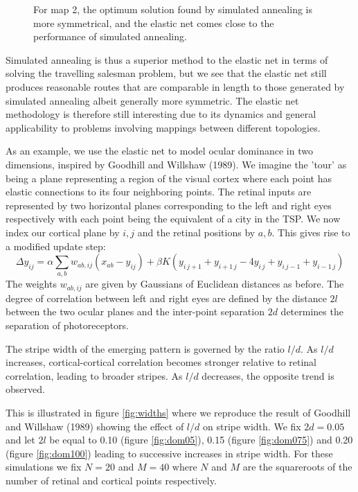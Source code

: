 \documentclass{article}
\begin{document}
\begin{figure}[h]
\begin{subfigure}[t]{0.27\linewidth}
		\label{fig:comp2an}	
	\end{subfigure}%
\caption{For map 2, the optimum solution found by simulated annealing is more symmetrical, and the elastic net comes close to the performance of simulated annealing.}
\label{fig:comp2}
\end{figure}


Simulated annealing is thus a superior method to the elastic net in terms of solving the travelling salesman problem, but we see that the elastic net still produces reasonable routes that are comparable in length to those generated by simulated annealing albeit generally more symmetric. The elastic net methodology is therefore still interesting due to its dynamics and general applicability to problems involving mappings between different topologies.

As an example, we use the elastic net to model ocular dominance in two dimensions, inspired by Goodhill and Willshaw (1989). We imagine the 'tour' as being a plane representing a region of the visual cortex where each point has elastic connections to its four neighboring points. The retinal inputs are represented by two horizontal planes corresponding to the left and right eyes respectively with each point being the equivalent of a city in the TSP. We now index our cortical plane by $i, j$ and the retinal positions by $a, b$. This gives rise to a modified update step:
\begin{equation}\label{eq:update2}
\Delta y_{ij} =\alpha \sum_{a,b}{w_{ab,ij}(x_{ab}-y_{ij})} + \beta K (y_{i \, j+1} + y_{i+1 \, j} - 4y_{i \, j} + y_{i \, j-1} + y_{i-1 \, j})
\end{equation}
The weights $w_{ab,ij}$ are given by Gaussians of Euclidean distances as before. The degree of correlation between left and right eyes are defined by the distance $2l$ between the two ocular planes and the inter-point separation $2d$ determines the separation of photoreceptors.

The stripe width of the emerging pattern is governed by the ratio $l/d$. As $l/d$ increases, cortical-cortical correlation becomes stronger relative to retinal correlation, leading to broader stripes. As $l/d$ decreases, the opposite trend is observed.

This is illustrated in figure \ref{fig:widths} where we reproduce the result of Goodhill and Willshaw (1989) showing the effect of $l/d$ on stripe width. We fix $2d=0.05$ and let $2l$ be equal to 0.10 (figure \ref{fig:dom05}), 0.15 (figure \ref{fig:dom075}) and 0.20 (figure \ref{fig:dom100}) leading to successive increases in stripe width. For these simulations we fix $N=20$ and $M=40$ where $N$ and $M$ are the squareroots of the number of retinal and cortical points respectively.
\end{document}
